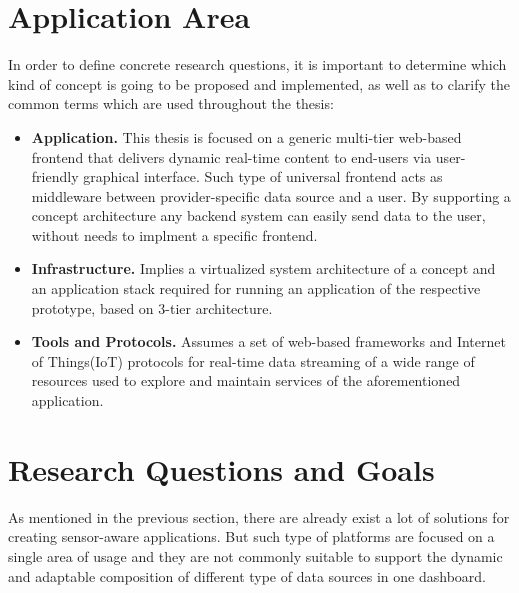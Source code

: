 \section{Application Area}
     In order to define concrete research questions, it is important to determine which kind of concept is going to be proposed and implemented, as well as to clarify the common terms which are used throughout the thesis:
     \begin{itemize}
          \item \textbf{Application.} This thesis is focused on a generic multi-tier web-based frontend that delivers dynamic real-time content to end-users via user-friendly graphical interface. Such type of universal frontend acts as middleware between provider-specific data source and a user. By supporting a concept architecture any backend system can easily send data to the user, without needs to implment a specific frontend.

          \item \textbf{Infrastructure.} Implies a virtualized system architecture of a concept and an application stack required for running an application of the respective prototype, based on 3-tier architecture.

          \item \textbf{Tools and Protocols.} Assumes a set of web-based frameworks and Internet of Things(IoT) protocols for real-time data streaming of a wide range of resources used to explore and maintain services of the aforementioned application.
     \end{itemize}


\section{Research Questions and Goals}
       As mentioned in the previous section, there are already exist a lot of solutions for creating sensor-aware applications. But such type of platforms are focused on a single area of usage and they are not commonly suitable to support the dynamic and adaptable composition of different type of data sources in one dashboard.

